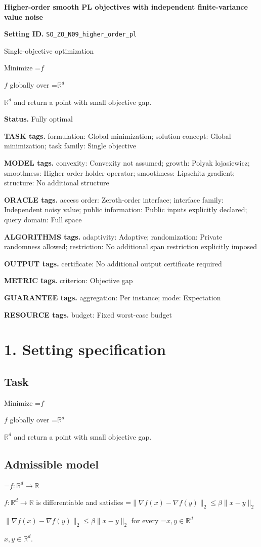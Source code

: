 \documentclass[10pt,a4paper]{article}
\newcommand{\AtlasMath}[1]{\par\begingroup\centering\setbox0=\hbox{$\displaystyle #1$}\ifdim\wd0>1.4\linewidth\typeout{ATLAS WIDE FORMULA: \the\wd0}\fi\ifdim\wd0>\linewidth\resizebox{\linewidth}{!}{\box0}\else\box0\fi\par\endgroup}
\newcommand{\AtlasInlineMath}[1]{\begingroup\setbox0=\hbox{$#1$}\ifdim\wd0>.4\linewidth\endgroup\AtlasMath{#1}\else\endgroup$#1$\fi}
\begin{document}
\raggedright

{\LARGE\bfseries\sffamily\color{AtlasNavy} Higher-order smooth PL objectives with independent finite-variance value noise\par}\vspace{5pt}
\textbf{Setting ID.} \texttt{SO\_\allowbreak{}ZO\_\allowbreak{}N09\_\allowbreak{}higher\_\allowbreak{}order\_\allowbreak{}pl}

Single-objective optimization

Minimize \AtlasInlineMath{f} globally over \AtlasInlineMath{\mathbb{R}^d} and return a point with small objective gap.

\textbf{Status.} Fully optimal

\textbf{TASK tags.} formulation: Global minimization; solution concept: Global minimization; task family: Single objective

\textbf{MODEL tags.} convexity: Convexity not assumed; growth: Polyak lojasiewicz; smoothness: Higher order holder operator; smoothness: Lipschitz gradient; structure: No additional structure

\textbf{ORACLE tags.} access order: Zeroth-order interface; interface family: Independent noisy value; public information: Public inputs explicitly declared; query domain: Full space

\textbf{ALGORITHMS tags.} adaptivity: Adaptive; randomization: Private randomness allowed; restriction: No additional span restriction explicitly imposed

\textbf{OUTPUT tags.} certificate: No additional output certificate required

\textbf{METRIC tags.} criterion: Objective gap

\textbf{GUARANTEE tags.} aggregation: Per instance; mode: Expectation

\textbf{RESOURCE tags.} budget: Fixed worst-case budget

\section{1. Setting specification}
\subsection{Task}
Minimize \AtlasInlineMath{f} globally over \AtlasInlineMath{\mathbb{R}^d} and return a point with small objective gap.

\subsection{Admissible model}
\AtlasInlineMath{f:\mathbb{R}^d\to\mathbb{R}} is differentiable and satisfies \AtlasInlineMath{\|\nabla f(x)-\nabla f(y)\|_2\le\beta\|x-y\|_2} for every \AtlasInlineMath{x,y\in\mathbb{R}^d}.
\end{document}
